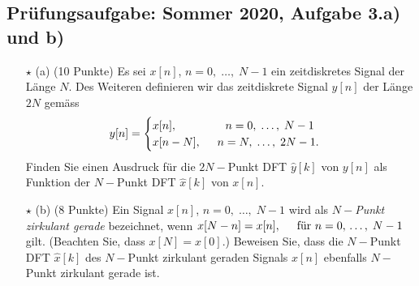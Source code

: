 \documentclass[11pt]{article}
\begin{document}
\subsection*{Prüfungsaufgabe: Sommer 2020, Aufgabe 3.a) und b)}
\vspace*{-0.5cm}
\begin{itemize}
    \item[$\star$ (a)] (10 Punkte) Es sei $x[n]$, $n=0, \; \dots, \; N-1$ ein zeitdiskretes Signal der Länge $N$. Des Weiteren definieren wir das zeitdiskrete Signal $y[n]$ der Länge $2N$ gemäss
    $$ y[n] = \begin{cases}
        x[n], \hspace{1.5cm} n = 0, \; \dots, \; N-1 \\
        x[n-N], \hspace{0.5cm} n = N, \; \dots, \; 2N-1.
    \end{cases} $$
    Finden Sie einen Ausdruck für die $2N-$Punkt DFT $\hat{y}[k]$ von $y[n]$ als Funktion der $N-$Punkt DFT $\hat{x}[k]$ von $x[n]$.
    \item[$\star$ (b)] (8 Punkte) Ein Signal  $x[n]$, $n=0, \; \dots, \; N-1$ wird als $N-$\textit{Punkt zirkulant gerade} bezeichnet, wenn $x[N-n] = x[n], \hspace{0.5cm} \text{für } n= 0, \, \dots, \; N-1$ gilt. (Beachten Sie, dass $x[N] = x[0]$.) Beweisen Sie, dass die $N-$Punkt DFT $\hat{x}[k]$ des $N-$Punkt zirkulant geraden Signals $x[n]$ ebenfalls $N-$Punkt zirkulant gerade ist.
\end{itemize}

\pagebreak


\pagebreak

\end{document}
